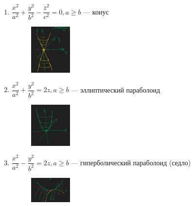 \documentclass[a4paper]{article}
\begin{document}
\begin{colloq}
\begin{enumerate}
\begin{figure}[H]
                \end{figure}
            \item $\dfrac{x^2}{a^2} + \dfrac{y^2}{b^2} - \dfrac{z^2}{c^2} = 0, a \geq b$ --- конус
                \begin{figure}[H]
                    \centering
                    \includegraphics[width=0.2\textwidth]{cone}
                \end{figure}
            \item $\dfrac{x^2}{a^2} + \dfrac{y^2}{b^2} = 2z, a \geq b$ --- эллиптический параболоид
                \begin{figure}[H]
                    \centering
                    \includegraphics[width=0.2\textwidth]{elliptical_paraboloid}
                \end{figure}
            \item $\dfrac{x^2}{a^2} - \dfrac{y^2}{b^2} = 2z, a \geq b$ --- гиперболический параболоид (седло)
                \begin{figure}[H]
                    \centering
                    \includegraphics[width=0.2\textwidth]{hyperbolic_paraboloid}
                \end{figure}
        \end{enumerate}
        

\end{colloq}
\end{document}
